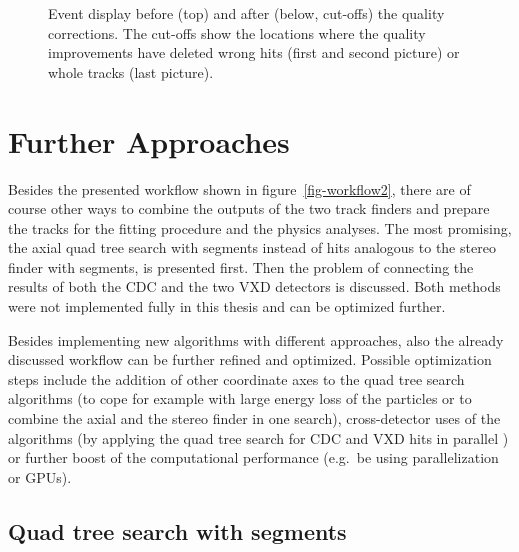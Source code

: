 \begin{figure}
\begin{tikzpicture}[>=latex']
    
  \end{tikzpicture}
  \caption{Event display before (top) and after (below, cut-offs) the quality corrections. The cut-offs show the locations where the quality improvements have deleted wrong hits (first and second picture) or whole tracks (last picture).}
  \label{fig-quality}
\end{figure}



\section{Further Approaches} \label{section-outlook}

Besides the presented workflow shown in figure~\ref{fig-workflow2}, there are of course other ways to combine the outputs of the two track finders and prepare the tracks for the fitting procedure and the physics analyses. The most promising, the axial quad tree search with segments instead of hits analogous to the stereo finder with segments, is presented first. Then the problem of connecting the results of both the CDC and the two VXD detectors is discussed. Both methods were not implemented fully in this thesis and can be optimized further.

Besides implementing new algorithms with different approaches, also the already discussed workflow can be further refined and optimized. Possible optimization steps include the addition of other coordinate axes to the quad tree search algorithms (to cope for example with large energy loss of the particles or to combine the axial and the stereo finder in one search), cross-detector uses of the algorithms (by applying the quad tree search for CDC and VXD hits in parallel \cite{markus}) or further boost of the computational performance (e.g.\ be using parallelization or GPUs).

\subsection{Quad tree search with segments}

